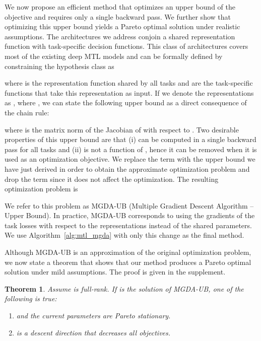 \documentclass{article}
\newtheorem{theorem}{Theorem}
\begin{document}
We now propose an efficient method that optimizes an upper bound of the objective and requires only a single backward pass. We further show that optimizing this upper bound yields a Pareto optimal solution under realistic assumptions. The architectures we address conjoin a shared representation function with task-specific decision functions. This class of architectures covers most of the existing deep MTL models and can be formally defined by constraining the hypothesis class as

where  is the representation function shared by all tasks and  are the task-specific functions that take this representation as input. If we denote the representations as \mbox{}, where , we can state the following upper bound as a direct consequence of the chain rule:

where   is the matrix norm of the Jacobian of  with respect to . Two desirable properties of this upper bound are that (i)  can be computed in a single backward pass for all tasks and (ii)  is not a function of , hence it can be removed when it is used as an optimization objective. We replace the  term with the upper bound we have just derived in order to obtain the approximate optimization problem and drop the  term since it does not affect the optimization. The resulting optimization problem is


We refer to this problem as MGDA-UB (Multiple Gradient Descent Algorithm -- Upper Bound). In practice, MGDA-UB corresponds to using the gradients of the task losses with respect to the representations instead of the shared parameters. We use Algorithm~\ref{alg:mtl_mgda} with only this change as the final method.

Although MGDA-UB is an approximation of the original optimization problem, we now state a theorem that shows that our method produces a Pareto optimal solution under mild assumptions. The proof is given in the supplement.

\begin{theorem}
Assume  is full-rank. If  is the solution of MGDA-UB, one of the following is true:
\begin{enumerate}[ topsep=0pt, label=\emph{(\alph*)},align=left,leftmargin=*]
\item  and the current parameters are Pareto stationary.
\item  is a descent direction that decreases all objectives.
\end{enumerate}
\label{thm}
\end{theorem}
\end{document}
